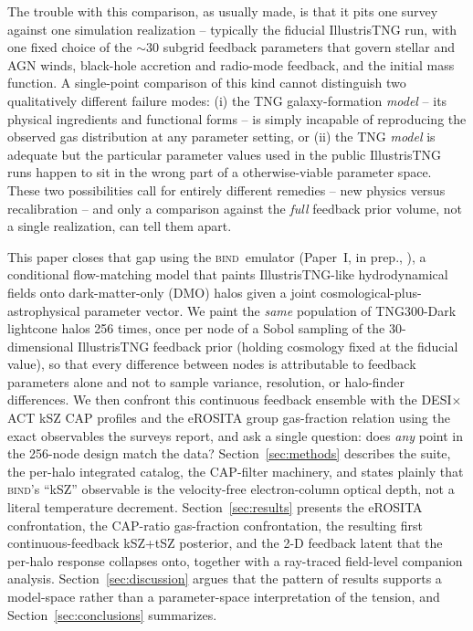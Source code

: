 \documentclass[11pt]{article}
\newcommand{\bind}{\textsc{bind}}
\begin{document}
The trouble with this comparison, as usually made, is that it pits one survey
against one simulation realization -- typically the fiducial IllustrisTNG run,
with one fixed choice of the $\sim$30 subgrid feedback parameters that govern
stellar and AGN winds, black-hole accretion and radio-mode feedback, and the
initial mass function. A single-point comparison of this kind cannot
distinguish two qualitatively different failure modes: (i) the TNG galaxy-formation
\emph{model} -- its physical ingredients and functional forms -- is simply
incapable of reproducing the observed gas distribution at any parameter setting,
or (ii) the TNG \emph{model} is adequate but the particular parameter values
used in the public IllustrisTNG runs happen to sit in the wrong part of a
otherwise-viable parameter space. These two possibilities call for entirely
different remedies -- new physics versus recalibration -- and only a
comparison against the \emph{full} feedback prior volume, not a single
realization, can tell them apart.

This paper closes that gap using the \bind\ emulator (Paper~I, in prep.,
\citealp{bindI}), a conditional flow-matching model that paints
IllustrisTNG-like hydrodynamical fields onto dark-matter-only (DMO) halos given
a joint cosmological-plus-astrophysical parameter vector. We paint the
\emph{same} population of TNG300-Dark lightcone halos 256 times, once per node of
a Sobol sampling of the 30-dimensional IllustrisTNG feedback prior (holding
cosmology fixed at the fiducial value), so that every difference between nodes
is attributable to feedback parameters alone and not to sample variance,
resolution, or halo-finder differences. We then confront this continuous
feedback ensemble with the DESI$\times$ACT kSZ CAP profiles and the eROSITA
group gas-fraction relation using the exact observables the surveys report,
and ask a single question: does \emph{any} point in the 256-node design match
the data? Section~\ref{sec:methods} describes the suite, the per-halo
integrated catalog, the CAP-filter machinery, and states plainly that
\bind's ``kSZ'' observable is the velocity-free electron-column optical depth,
not a literal temperature decrement. Section~\ref{sec:results} presents the
eROSITA confrontation, the CAP-ratio gas-fraction confrontation, the resulting
first continuous-feedback kSZ+tSZ posterior, and the 2-D feedback latent that
the per-halo response collapses onto, together with a ray-traced field-level
companion analysis. Section~\ref{sec:discussion} argues that the pattern of
results supports a model-space rather than a parameter-space interpretation of
the tension, and Section~\ref{sec:conclusions} summarizes.
\end{document}
